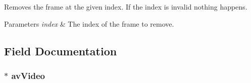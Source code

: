Removes the frame at the given index. If the index is invalid nothing happens. 


\begin{DoxyParams}{Parameters}
{\em index} & The index of the frame to remove.\\
\hline
\end{DoxyParams}


\subsection{Field Documentation}
\hypertarget{classModel_1_1AVVideo_a2ee559c7a937231b8bdc36ed5a15d865}{}
\subsubsection[{av\+Video}]{$\ast$ av\+Video}\label{classModel_1_1AVVideo_a2ee559c7a937231b8bdc36ed5a15d865}
